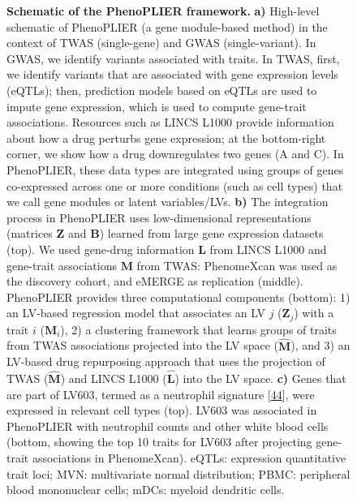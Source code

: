 \documentclass[
]{article}
\begin{document}
\begin{figure}
\hypertarget{fig:entire_process}{%
\centering

\caption{\textbf{Schematic of the PhenoPLIER framework.}
\textbf{a)} High-level schematic of PhenoPLIER (a gene module-based method) in the context of TWAS (single-gene) and GWAS (single-variant).
In GWAS, we identify variants associated with traits.
In TWAS, first, we identify variants that are associated with gene expression levels (eQTLs); then, prediction models based on eQTLs are used to impute gene expression, which is used to compute gene-trait associations.
Resources such as LINCS L1000 provide information about how a drug perturbs gene expression; at the bottom-right corner, we show how a drug downregulates two genes (A and C).
In PhenoPLIER, these data types are integrated using groups of genes co-expressed across one or more conditions (such as cell types) that we call gene modules or latent variables/LVs.
\textbf{b)} The integration process in PhenoPLIER uses low-dimensional representations (matrices \(\mathbf{Z}\) and \(\mathbf{B}\)) learned from large gene expression datasets (top).
We used gene-drug information \(\mathbf{L}\) from LINCS L1000 and gene-trait associations \(\mathbf{M}\) from TWAS: PhenomeXcan was used as the discovery cohort, and eMERGE as replication (middle).
PhenoPLIER provides three computational components (bottom):
1) an LV-based regression model that associates an LV \(j\) (\(\mathbf{Z}_j\)) with a trait \(i\) (\(\mathbf{M}_i\)),
2) a clustering framework that learns groups of traits from TWAS associations projected into the LV space (\(\hat{\mathbf{M}}\)),
and 3) an LV-based drug repurposing approach that uses the projection of TWAS (\(\hat{\mathbf{M}}\)) and LINCS L1000 (\(\hat{\mathbf{L}}\)) into the LV space.
\textbf{c)} Genes that are part of LV603, termed as a neutrophil signature {[}\protect\hyperlink{ref-14rnBunuZ}{44}{]}, were expressed in relevant cell types (top).
LV603 was associated in PhenoPLIER with neutrophil counts and other white blood cells (bottom, showing the top 10 traits for LV603 after projecting gene-trait associations in PhenomeXcan).
eQTLs: expression quantitative trait loci;
MVN: multivariate normal distribution;
PBMC: peripheral blood mononuclear cells;
mDCs: myeloid dendritic cells.}\label{fig:entire_process}
}
\end{figure}
\end{document}
